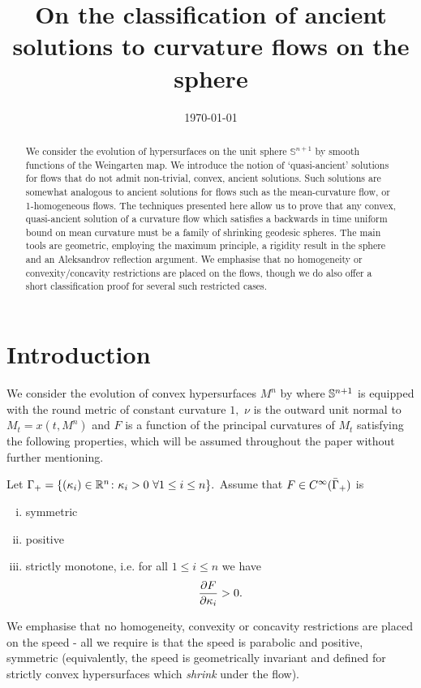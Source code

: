 \documentclass{amsart}
\begin{document}
\title[Ancient solutions to curvature flows in the sphere]
 {On the classification of ancient solutions to curvature flows on the sphere}

\curraddr{}
\email{}
\date{\today}

\dedicatory{}
\subjclass[2010]{}
\keywords{}

\begin{abstract}
We consider the evolution of hypersurfaces on the unit sphere $\mathbb{S}^{n+1}$ by smooth functions of the Weingarten map. We introduce the notion of `quasi-ancient' solutions for flows that do not admit non-trivial, convex, ancient solutions. Such solutions are somewhat analogous to ancient solutions for flows such as the mean-curvature flow, or 1-homogeneous flows. The techniques presented here allow us to prove that any convex, quasi-ancient solution of a curvature flow which satisfies a backwards in time uniform bound on mean curvature must be a family of shrinking geodesic spheres. The main tools are geometric, employing the maximum principle, a rigidity result in the sphere and an Aleksandrov reflection argument. We emphasise that no homogeneity or convexity/concavity restrictions are placed on the flows, though we do also offer a short classification proof for several such restricted cases.
\end{abstract}

\maketitle

\section{Introduction}
\label{sec:intro}

We consider the evolution of convex hypersurfaces $M^n$ by
where \(\S^{n+1}\) is equipped with the round metric of constant curvature $1,$ $\nu$ is the outward unit normal to $M_t=x(t,M^n)$ and $F$ is a function of the principal curvatures of $M_t$ satisfying the following properties, which will be assumed throughout the paper without further mentioning.
\begin{ass} \label{F}
Let $\G_{+}=\{(\k_i)\in\R^n\cn \k_i>0~\forall 1\leq i\leq n\}.$ Assume that $F\in C^{\8}(\-\G_{+})$ is
\begin{enumerate}[(i)]
\item{symmetric}
\item{positive}
\item{strictly monotone, i.e. for all $1\leq i\leq n$ we have
\[\fr{\del F}{\del \k_i}>0.\]}
\end{enumerate}
\end{ass}
We emphasise that no homogeneity, convexity or concavity restrictions are placed on the speed - all we require is that the speed is parabolic and positive, symmetric (equivalently, the speed is geometrically invariant and defined for strictly convex hypersurfaces which \emph{shrink} under the flow).
\end{document}
